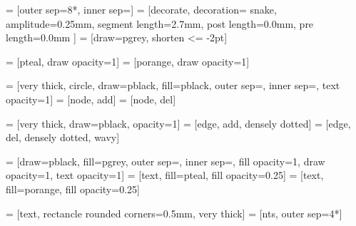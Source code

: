  = [outer sep=8*\nodespacing, inner sep=\nodesize]
 = [decorate,
                    decoration={%
                        snake,
                        amplitude=0.25mm,
                        segment length=2.7mm,
                        post length=0.0mm,
                        pre length=0.0mm
                    }]
 = [draw=pgrey, shorten <= -2pt]

 = [pteal, draw opacity=1]
 = [porange, draw opacity=1]

 = [very thick,
                    circle,
                    draw=pblack,
                    fill=pblack,
                    outer sep=\nodespacing,
                    inner sep=\nodesize,
                    text opacity=1]
 = [node, add]
 = [node, del]

 = [very thick, draw=pblack, opacity=1]
 = [edge, add, densely dotted]
 = [edge, del, densely dotted, wavy]

 = [draw=pblack,  %
                    fill=pgrey,
                    outer sep=\nodespacing,
                    inner sep=\nodesize,
                    fill opacity=1,
                    draw opacity=1,
                    text opacity=1]
 = [text, fill=pteal, fill opacity=0.25]
 = [text, fill=porange, fill opacity=0.25]

 = [text,
                   rectancle
                   rounded corners=0.5mm,
                   very thick]
 = [nts, outer sep=4*\nodespacing]


